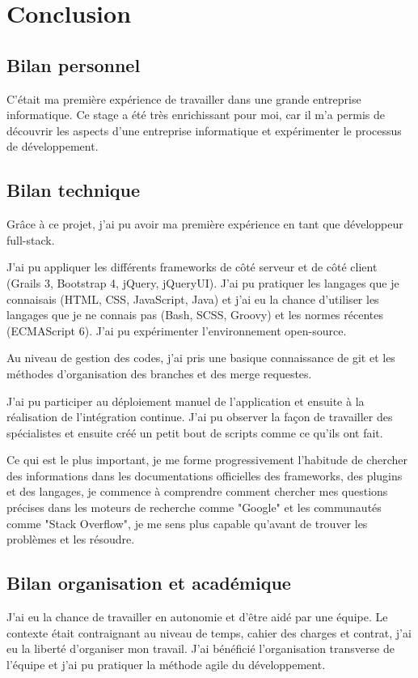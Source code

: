 \chapter{Conclusion}
\label{chap:Conclusion}

\section{Bilan personnel}
C'était ma première expérience de travailler dans une grande entreprise informatique.
Ce stage a été très enrichissant pour moi,
car il m’a permis de découvrir les aspects d'une entreprise informatique et expérimenter le processus de développement.

\section{Bilan technique}
Grâce à ce projet, j'ai pu avoir ma première expérience en tant que développeur full-stack.

J'ai pu appliquer les différents frameworks de côté serveur et de côté client (Grails 3, Bootstrap 4, jQuery, jQueryUI).
J'ai pu pratiquer les langages que je connaisais (HTML, CSS, JavaScript, Java)
et j'ai eu la chance d'utiliser les langages que je ne connais pas (Bash, SCSS, Groovy) et les normes récentes (ECMAScript 6).
J'ai pu expérimenter l'environnement open-source.

Au niveau de gestion des codes, j'ai pris une basique connaissance de git et les méthodes d'organisation des branches et des merge requestes.

J'ai pu participer au déploiement manuel de l'application et ensuite à la réalisation de l'intégration continue.
J'ai pu observer la façon de travailler des spécialistes et ensuite créé un petit bout de scripts comme ce qu'ils ont fait.

Ce qui est le plus important,
je me forme progressivement l'habitude de chercher des informations dans les documentations officielles des frameworks, des plugins et des langages,
je commence à comprendre comment chercher mes questions précises dans les moteurs de recherche comme "Google" et les communautés comme "Stack Overflow",
je me sens plus capable qu'avant de trouver les problèmes et les résoudre.

\section{Bilan organisation et académique}
J'ai eu la chance de travailler en autonomie et d'être aidé par une équipe.
Le contexte était contraignant au niveau de temps, cahier des charges et contrat,
j'ai eu la liberté d'organiser mon travail.
J'ai bénéficié l'organisation transverse de l'équipe et j'ai pu pratiquer la méthode agile du développement.
